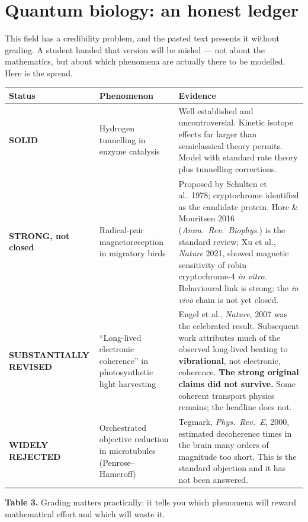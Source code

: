 \clearpage
\renewcommand{\sectioncolor}{quantum}
\section{Quantum biology: an honest ledger}\label{sec:qbio}

This field has a credibility problem, and the pasted text presents it without grading. A student
handed that version will be misled --- not about the mathematics, but about which phenomena are
actually there to be modelled. Here is the spread.

\begin{center}\small
\begin{tabular}{@{}>{\raggedright\arraybackslash}p{2.4cm}>{\raggedright\arraybackslash}p{5.1cm}>{\raggedright\arraybackslash}p{8.8cm}@{}}
\toprule
\rowcolor{quantum!13}
\textbf{\color{quantum}Status} & \textbf{\color{quantum}Phenomenon} & \textbf{\color{quantum}Evidence}\\
\midrule
\rowcolor{bio!13}
\textbf{SOLID} & Hydrogen tunnelling in enzyme catalysis &
 Well established and uncontroversial. Kinetic isotope effects far larger than semiclassical theory
 permits. Model with standard rate theory plus tunnelling corrections.\\
\addlinespace[2pt]
\rowcolor{bio!7}
\textbf{STRONG, not closed} & Radical-pair magnetoreception in migratory birds &
 Proposed by Schulten et al.\ 1978; cryptochrome identified as the candidate protein. Hore \&
 Mouritsen 2016 (\textit{Annu.\ Rev.\ Biophys.}) is the standard review; Xu et al., \textit{Nature}
 2021, showed magnetic sensitivity of robin cryptochrome-4 \emph{in vitro}. Behavioural link is
 strong; the \emph{in vivo} chain is not yet closed.\\
\addlinespace[2pt]
\rowcolor{sand!16}
\textbf{SUBSTANTIALLY REVISED} & ``Long-lived electronic coherence'' in photosynthetic light
 harvesting &
 Engel et al., \textit{Nature}, 2007 was the celebrated result. Subsequent work attributes much of
 the observed long-lived beating to \textbf{vibrational}, not electronic, coherence. \textbf{The
 strong original claims did not survive.} Some coherent transport physics remains; the headline does
 not.\\
\addlinespace[2pt]
\rowcolor{crimson!10}
\textbf{WIDELY REJECTED} & Orchestrated objective reduction in microtubules (Penrose--Hameroff) &
 Tegmark, \textit{Phys.\ Rev.\ E}, 2000, estimated decoherence times in the brain many orders of
 magnitude too short. This is the standard objection and it has not been answered.\\
\bottomrule
\end{tabular}
\end{center}
\vspace{-2pt}
\begin{center}\begin{minipage}{0.93\textwidth}\footnotesize\color{slate}
\textbf{Table 3.}\; Grading matters practically: it tells you which phenomena will reward
mathematical effort and which will waste it.
\end{minipage}\end{center}

